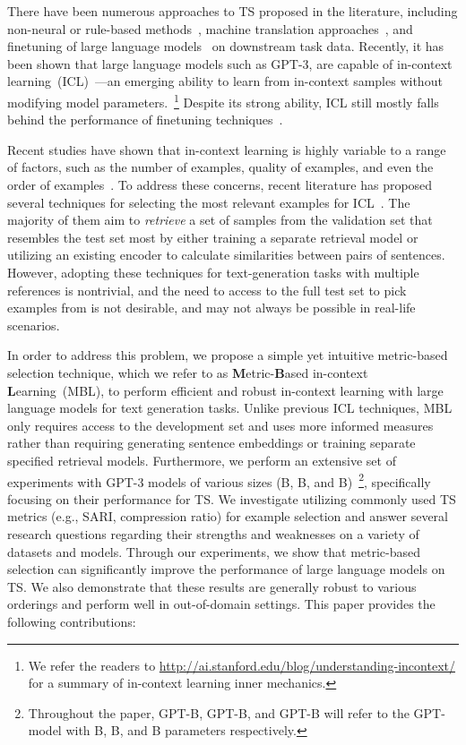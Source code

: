 \documentclass[11pt]{article}
\begin{document}
There have been numerous approaches to TS proposed in the literature, including non-neural or rule-based methods~\citep{NassarAH19}, machine translation approaches~\citep{xu-etal-2016-optimizing}, and finetuning of large language models~\citep{sheang-saggion-2021-controllable} on downstream task data. Recently, it has been shown that large language models such as GPT-3, are capable of in-context learning~(ICL)~\cite{brown2020language}---an emerging ability to learn from in-context samples without modifying model parameters.~\footnote{We refer the readers to \url{http://ai.stanford.edu/blog/understanding-incontext/} for a summary of in-context learning inner mechanics.} Despite its strong ability, ICL still mostly falls behind the performance of finetuning techniques~\citep{surveyICL}. 



Recent studies have shown that in-context learning is highly variable to a range of factors, such as the number of examples, quality of examples, and even the order of examples~\citep{lu-etal-2022-fantastically,kategpt,surveyICL}. To address these concerns, recent literature has proposed several techniques for selecting the most relevant examples for ICL~\citep{kategpt, SorensenRRSRDKF22,Gonen22,rubin-etal-2022-learning}. The majority of them aim to \textit{retrieve} a set of samples from the validation set that resembles the test set most by either training a separate retrieval model or utilizing an existing encoder to calculate similarities between pairs of sentences. However, adopting these techniques for text-generation tasks with multiple references is nontrivial, and the need to access to the full test set to pick examples from is not desirable, and may not always be possible in real-life scenarios.   



In order to address this problem, we propose a simple yet intuitive metric-based selection technique, which we refer to as \textbf{M}etric-\textbf{B}ased in-context \textbf{L}earning~(MBL), to perform efficient and robust in-context learning with large language models for text generation tasks. Unlike previous ICL techniques, MBL only requires access to the development set and uses more informed measures rather than requiring generating sentence embeddings or training separate specified retrieval models. Furthermore, we perform an extensive set of experiments with GPT-3 models of various sizes (B, B, and B)~\footnote{Throughout the paper, GPT-B, GPT-B, and GPT-B will refer to the GPT- model with B, B, and B parameters respectively.}, specifically focusing on their performance for TS. We investigate utilizing commonly used TS metrics (e.g., SARI, compression ratio) for example selection and answer several research questions regarding their strengths and weaknesses on a variety of datasets and models. Through our experiments, we show that metric-based selection can significantly improve the performance of large language models on TS. We also demonstrate that these results are generally robust to various orderings and perform well in out-of-domain settings. This paper provides the following contributions:
\end{document}
